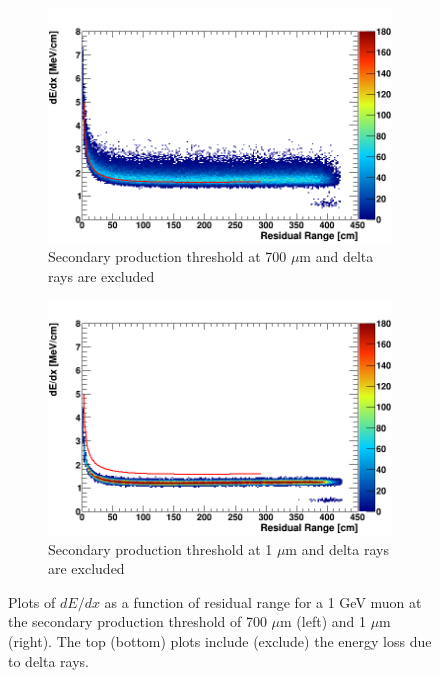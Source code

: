\begin{figure}[tbp!]
\begin{subfigure}[b]{0.495\textwidth}
            \centering 
            \includegraphics[width=\textwidth]{derr_mu_only_700um}
            \caption{Secondary production threshold at 700 $\mu$m and delta rays are excluded}%
            \label{fig:derr_mu_only_700}
        \end{subfigure}
        \hfill
        \begin{subfigure}[b]{0.495\textwidth}   
            \centering 
            \includegraphics[width=\textwidth]{derr_mu_only_1um}
            \caption{Secondary production threshold at 1 $\mu$m and delta rays are excluded}%
            \label{fig:derr_mu_only_1}
        \end{subfigure}
        \caption{
	Plots of $dE/dx$ as a function of residual range for a 1 GeV muon at the secondary production threshold of 700 $\mu$m (left) and 1 $\mu$m (right). 
	The top (bottom) plots include (exclude) the energy loss due to delta rays. 
	}
        \label{fig:mu_derr}
\end{figure}

